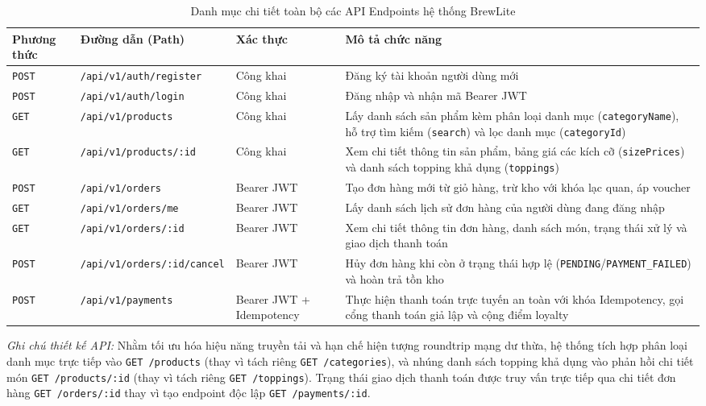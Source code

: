 \documentclass[12pt,a4paper,oneside]{report}
\begin{document}
\begin{table}[H]
\centering
\small
\caption{Danh mục chi tiết toàn bộ các API Endpoints hệ thống BrewLite}
\label{tab:full-api-list}
\begin{tabularx}{\textwidth}{llp{2.5cm}X}
\toprule
\textbf{Phương thức} & \textbf{Đường dẫn (Path)} & \textbf{Xác thực} & \textbf{Mô tả chức năng} \\
\midrule
\texttt{POST} & \texttt{/api/v1/auth/register} & Công khai & Đăng ký tài khoản người dùng mới \\
\texttt{POST} & \texttt{/api/v1/auth/login} & Công khai & Đăng nhập và nhận mã Bearer JWT \\
\midrule
\texttt{GET} & \texttt{/api/v1/products} & Công khai & Lấy danh sách sản phẩm kèm phân loại danh mục (\texttt{categoryName}), hỗ trợ tìm kiếm (\texttt{search}) và lọc danh mục (\texttt{categoryId}) \\
\texttt{GET} & \texttt{/api/v1/products/:id} & Công khai & Xem chi tiết thông tin sản phẩm, bảng giá các kích cỡ (\texttt{sizePrices}) và danh sách topping khả dụng (\texttt{toppings}) \\
\midrule
\texttt{POST} & \texttt{/api/v1/orders} & Bearer JWT & Tạo đơn hàng mới từ giỏ hàng, trừ kho với khóa lạc quan, áp voucher \\
\texttt{GET} & \texttt{/api/v1/orders/me} & Bearer JWT & Lấy danh sách lịch sử đơn hàng của người dùng đang đăng nhập \\
\texttt{GET} & \texttt{/api/v1/orders/:id} & Bearer JWT & Xem chi tiết thông tin đơn hàng, danh sách món, trạng thái xử lý và giao dịch thanh toán \\
\texttt{POST} & \texttt{/api/v1/orders/:id/cancel} & Bearer JWT & Hủy đơn hàng khi còn ở trạng thái hợp lệ (\texttt{PENDING}/\texttt{PAYMENT\_FAILED}) và hoàn trả tồn kho \\
\midrule
\texttt{POST} & \texttt{/api/v1/payments} & Bearer JWT + Idempotency & Thực hiện thanh toán trực tuyến an toàn với khóa Idempotency, gọi cổng thanh toán giả lập và cộng điểm loyalty \\
\bottomrule
\end{tabularx}
\end{table}

\noindent\textit{Ghi chú thiết kế API:} Nhằm tối ưu hóa hiệu năng truyền tải và hạn chế hiện tượng roundtrip mạng dư thừa, hệ thống tích hợp phân loại danh mục trực tiếp vào \texttt{GET /products} (thay vì tách riêng \texttt{GET /categories}), và nhúng danh sách topping khả dụng vào phản hồi chi tiết món \texttt{GET /products/:id} (thay vì tách riêng \texttt{GET /toppings}). Trạng thái giao dịch thanh toán được truy vấn trực tiếp qua chi tiết đơn hàng \texttt{GET /orders/:id} thay vì tạo endpoint độc lập \texttt{GET /payments/:id}.
\end{document}
